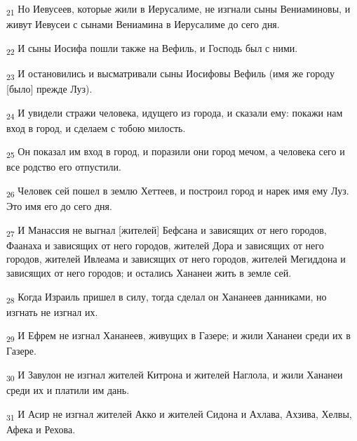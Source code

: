 \begin{tcolorbox}
\textsubscript{21} Но Иевусеев, которые жили в Иерусалиме, не изгнали сыны Вениаминовы, и живут Иевусеи с сынами Вениамина в Иерусалиме до сего дня.
\end{tcolorbox}
\begin{tcolorbox}
\textsubscript{22} И сыны Иосифа пошли также на Вефиль, и Господь был с ними.
\end{tcolorbox}
\begin{tcolorbox}
\textsubscript{23} И остановились и высматривали сыны Иосифовы Вефиль (имя же городу [было] прежде Луз).
\end{tcolorbox}
\begin{tcolorbox}
\textsubscript{24} И увидели стражи человека, идущего из города, и сказали ему: покажи нам вход в город, и сделаем с тобою милость.
\end{tcolorbox}
\begin{tcolorbox}
\textsubscript{25} Он показал им вход в город, и поразили они город мечом, а человека сего и все родство его отпустили.
\end{tcolorbox}
\begin{tcolorbox}
\textsubscript{26} Человек сей пошел в землю Хеттеев, и построил город и нарек имя ему Луз. Это имя его до сего дня.
\end{tcolorbox}
\begin{tcolorbox}
\textsubscript{27} И Манассия не выгнал [жителей] Бефсана и зависящих от него городов, Фаанаха и зависящих от него городов, жителей Дора и зависящих от него городов, жителей Ивлеама и зависящих от него городов, жителей Мегиддона и зависящих от него городов; и остались Хананеи жить в земле сей.
\end{tcolorbox}
\begin{tcolorbox}
\textsubscript{28} Когда Израиль пришел в силу, тогда сделал он Хананеев данниками, но изгнать не изгнал их.
\end{tcolorbox}
\begin{tcolorbox}
\textsubscript{29} И Ефрем не изгнал Хананеев, живущих в Газере; и жили Хананеи среди их в Газере.
\end{tcolorbox}
\begin{tcolorbox}
\textsubscript{30} И Завулон не изгнал жителей Китрона и жителей Наглола, и жили Хананеи среди их и платили им дань.
\end{tcolorbox}
\begin{tcolorbox}
\textsubscript{31} И Асир не изгнал жителей Акко и жителей Сидона и Ахлава, Ахзива, Хелвы, Афека и Рехова.
\end{tcolorbox}

